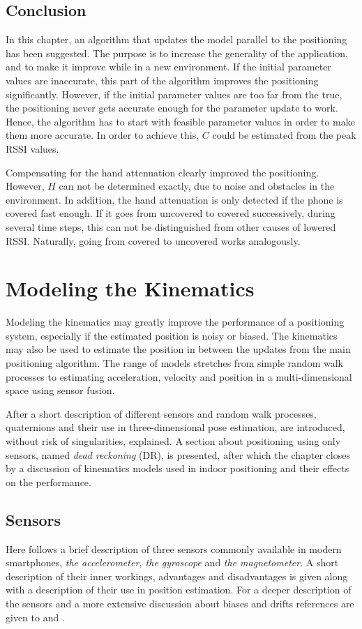 \documentclass{LTHthesis}
\begin{document}
\section{Conclusion}
In this chapter, an algorithm that updates the model parallel to the positioning has been suggested. The purpose is to increase the generality of the application, and to make it improve while in a new environment. If the initial parameter values are inaccurate, this part of the algorithm improves the positioning significantly. However, if the initial parameter values are too far from the true, the positioning never gets accurate enough for the parameter update to work. Hence, the algorithm has to start with feasible parameter values in order to make them more accurate. In order to achieve this, $C$ could be estimated from the peak RSSI values.


Compensating for the hand attenuation clearly improved the positioning. However, $H$ can not be determined exactly, due to noise and obstacles in the environment. In addition, the hand attenuation is only detected if the phone is covered fast enough. If it goes from uncovered to covered successively, during several time steps, this can not be distinguished from other causes of lowered RSSI. Naturally, going from covered to uncovered works analogously.

\chapter{Modeling the Kinematics} %
\label{chap:kin}
%
Modeling the kinematics may greatly improve the performance of a positioning system, especially if the estimated position is noisy or biased. The kinematics may also be used to estimate the position in between the updates from the main positioning algorithm. The range of models stretches from simple random walk processes to estimating acceleration, velocity and position in a multi-dimensional space using sensor fusion.

After a short description of different sensors and random walk processes, quaternions and their use in three-dimensional pose  estimation,  are introduced, without risk of singularities, explained. A section about positioning using only sensors, named \emph{dead reckoning} (DR), is presented, after which the chapter closes by a discussion of kinematics models used in indoor positioning and their effects on the performance.   
%
\section{Sensors}
Here follows a brief description of three sensors commonly available in modern smartphones, \emph{the accelerometer, the gyroscope} and \emph{the magnetometer}. A short description of their inner workings, advantages and disadvantages is given along with a description of their use in position estimation. For a deeper description of the sensors and a more extensive discussion about biases and drifts references are given to \cite{bently88} and \cite{morris96}. 
%
\end{document}
